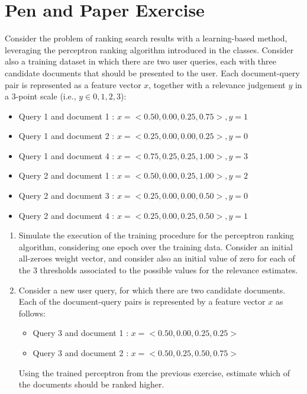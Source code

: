 \documentclass[12pt]{article}
\begin{document}
\section{Pen and Paper Exercise}

Consider the problem of ranking search results with a learning-based method, leveraging the perceptron ranking algorithm introduced in the classes. Consider also a training dataset in which there are two user queries, each with three candidate documents that should be presented to the user. Each document-query pair is represented as a feature vector $x$, together with a relevance judgement $y$ in a 3-point scale (i.e., $y \in {0,1,2,3}$):

\begin{itemize}
\item Query 1 and document 1 : $x=<0.50, 0.00, 0.25, 0.75> , y=1$
\item Query 1 and document 2 : $x=<0.25, 0.00, 0.00, 0.25> , y=0$
\item Query 1 and document 4 : $x=<0.75, 0.25, 0.25, 1.00> , y=3$

\item Query 2 and document 1 : $x=<0.50, 0.00, 0.25, 1.00> , y=2$
\item Query 2 and document 3 : $x=<0.25, 0.00, 0.00, 0.50> , y=0$
\item Query 2 and document 4 : $x=<0.25, 0.00, 0.25, 0.50> , y=1$
\end{itemize}

\begin{enumerate}
\item Simulate the execution of the training procedure for the perceptron ranking algorithm, considering one epoch over the training data. Consider an initial all-zeroes weight vector, and consider also an initial value of zero for each of the 3 thresholds associated to the possible values for the relevance estimates.

\item Consider a new user query, for which there are two candidate documents. Each of the document-query pairs is represented by a feature vector $x$ as follows:

\begin{itemize}
\item Query 3 and document 1 : $x=<0.50, 0.00, 0.25, 0.25>$
\item Query 3 and document 2 : $x=<0.50, 0.25, 0.50, 0.75>$
\end{itemize}

Using the trained perceptron from the previous exercise, estimate which of the documents should be ranked higher.
\end{enumerate}
\end{document}
